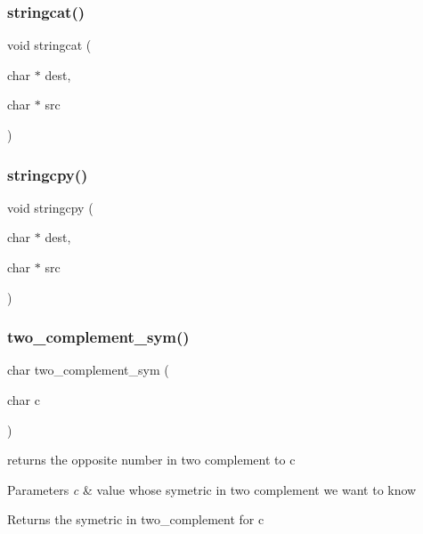 \subsubsection{\texorpdfstring{stringcat()}{stringcat()}}
{\footnotesize\ttfamily void stringcat (\begin{DoxyParamCaption}\item[{char $\ast$}]{dest,  }\item[{char $\ast$}]{src }\end{DoxyParamCaption})}

\hypertarget{group__utilities_gaf3cb5100a651058103311c52a27b4105}{}\label{group__utilities_gaf3cb5100a651058103311c52a27b4105} 
\subsubsection{\texorpdfstring{stringcpy()}{stringcpy()}}
{\footnotesize\ttfamily void stringcpy (\begin{DoxyParamCaption}\item[{char $\ast$}]{dest,  }\item[{char $\ast$}]{src }\end{DoxyParamCaption})}

\hypertarget{group__utilities_gac0df2a1416cd59f12dbc6adfd5f69ba3}{}\label{group__utilities_gac0df2a1416cd59f12dbc6adfd5f69ba3} 
\subsubsection{\texorpdfstring{two\+\_\+complement\+\_\+sym()}{two\_complement\_sym()}}
{\footnotesize\ttfamily char two\+\_\+complement\+\_\+sym (\begin{DoxyParamCaption}\item[{char}]{c }\end{DoxyParamCaption})}



returns the opposite number in two complement to c 


\begin{DoxyParams}{Parameters}
{\em c} & value whose symetric in two complement we want to know \\
\hline
\end{DoxyParams}
\begin{DoxyReturn}{Returns}
the symetric in two\+\_\+complement for c 
\end{DoxyReturn}
